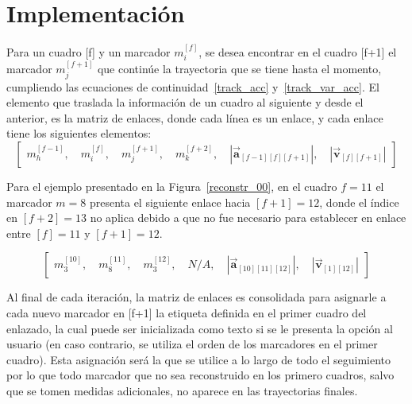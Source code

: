 \section{Implementación}

Para un cuadro [f] y un marcador $m_{i}^{[f]}$, se desea encontrar en el cuadro [f+1] el marcador $m_{j}^{[f+1]}$ que continúe la trayectoria que se tiene hasta el momento, cumpliendo las ecuaciones de continuidad~\ref{track_acc} y~\ref{track_var_acc}. El elemento que traslada la información de un cuadro al siguiente y desde el anterior, es la matriz de enlaces, donde cada línea es un enlace, y cada enlace tiene los siguientes elementos:
\begin{equation}
\begin{bmatrix}
  m_{h}^{[f-1]}, \quad m_{i}^{[f]}, \quad m_{j}^{[f+1]}, \quad m_{k}^{[f+2]}, \quad \left|\boldsymbol{\overrightarrow{a}}_{[f-1][f][f+1]}\right|, \quad \left|\boldsymbol{\overrightarrow{v}}_{[f][f+1]}\right|
\end{bmatrix}
\end{equation}

Para el ejemplo presentado en la Figura~\ref{reconstr_00}, en el cuadro $f=11$ el marcador $m=8$ presenta el siguiente enlace hacia $[f+1]=12$, donde el índice en $[f+2]=13$ no aplica debido a que no fue necesario para establecer en enlace entre $[f]=11$ y $[f+1]=12$.

\begin{equation}
\begin{bmatrix}
  m_{3}^{[10]}, \quad m_{8}^{[11]}, \quad m_{3}^{[12]}, \quad N/A, \quad \left|\boldsymbol{\overrightarrow{a}}_{[10][11][12]}\right|, \quad \left|\boldsymbol{\overrightarrow{v}}_{[1][12]}\right|
\end{bmatrix}
\end{equation}

Al final de cada iteración, la matriz de enlaces es consolidada para asignarle a cada nuevo marcador en [f+1] la etiqueta definida en el primer cuadro del enlazado, la cual puede ser inicializada como texto si se le presenta la opción al usuario (en caso contrario, se utiliza el orden de los marcadores en el primer cuadro). Esta asignación será la que se utilice a lo largo de todo el seguimiento por lo que todo marcador que no sea reconstruido en los primero cuadros, salvo que se tomen medidas adicionales, no aparece en las trayectorias finales.
\\

